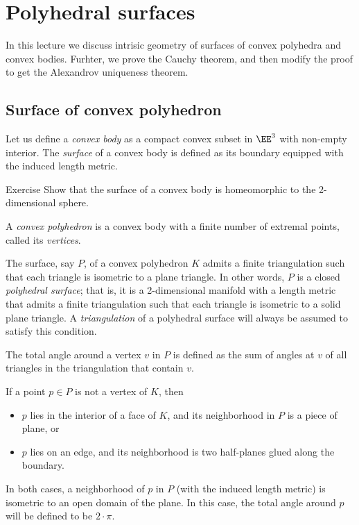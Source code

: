 \chapter{Polyhedral surfaces}\label{chap:alex-embedding}

In this lecture we discuss intrisic geometry of surfaces of convex polyhedra and convex bodies.
Furhter, we prove the Cauchy theorem, and then modify the proof to get the Alexandrov uniqueness theorem.

\section{Surface of convex polyhedron}

Let us define a \emph{convex body} as a compact convex subset in $\EE^3$ with non-empty interior.
The \emph{surface} of a convex body is defined as its boundary equipped with the induced length metric.

\begin{thm}{Exercise}\label{ex:surf-S2}
Show that the surface of a convex body is homeomorphic to the 2-dimensional sphere.
\end{thm}

A \emph{convex polyhedron} is a convex body with a finite number of extremal points, called its \emph{vertices}.

The surface, say $P$, of a convex polyhedron $K$ admits a finite triangulation such that each triangle is isometric to a plane triangle.
In other words, $P$ is a closed \emph{polyhedral surface};
that is, it is a 2-dimensional manifold with a length metric that admits a finite triangulation such that each triangle is isometric to a solid plane triangle.
A \emph{triangulation} of a polyhedral surface will always be assumed to satisfy this condition.

The total angle around a vertex $v$ in $P$ is defined as the sum of angles at $v$ of all triangles in the triangulation that contain $v$.

If a point $p\in P$ is not a vertex of $K$,
then
\begin{itemize}
\item $p$ lies in the interior of a face of $K$, and its neighborhood in $P$ is a piece of plane, or
\item $p$ lies on an edge, and its neighborhood is two half-planes glued along the boundary.
\end{itemize}
In both cases, a neighborhood of $p$ in $P$ (with the induced length metric) is isometric to an open domain of the plane.
In this case, the total angle around $p$ will be defined to be $2\cdot\pi$.


